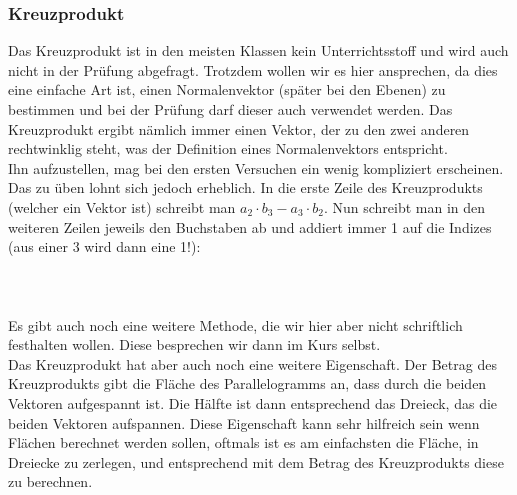 	\subsubsection{Kreuzprodukt}
		Das Kreuzprodukt ist in den meisten Klassen kein Unterrichtsstoff und wird
		auch nicht in der Prüfung abgefragt. Trotzdem wollen wir es hier ansprechen,
		da dies eine einfache Art ist, einen Normalenvektor (später bei den Ebenen) zu
		bestimmen und bei der Prüfung darf dieser auch verwendet werden. Das
		Kreuzprodukt ergibt nämlich immer einen Vektor, der zu den zwei anderen
		rechtwinklig steht, was der Definition eines Normalenvektors entspricht.\\
		Ihn aufzustellen, mag bei den ersten Versuchen ein wenig kompliziert
		erscheinen. Das zu üben lohnt sich jedoch erheblich. In die erste Zeile des
		Kreuzprodukts (welcher ein Vektor ist) schreibt man \(a_2\cdot b_3-a_3\cdot
		b_2\). Nun schreibt man in den weiteren Zeilen jeweils den Buchstaben ab und
		addiert immer 1 auf die Indizes (aus einer 3 wird dann eine 1!):
		\\ \\
		\formel{
			\[\vec{a} \times \vec{b}=
			\begin{pmatrix}
			 a_2b_3-a_3b_2\\
			 a_3b_1-a_1b_3\\
			 a_1b_2-a_2b_1
			\end{pmatrix}\]
		}
		\\ \\
		Es gibt auch noch eine weitere Methode, die wir hier aber nicht schriftlich
		festhalten wollen. Diese besprechen wir dann im Kurs selbst.\\
		Das Kreuzprodukt hat aber auch noch eine weitere Eigenschaft. Der Betrag des
		Kreuzprodukts gibt die Fläche des Parallelogramms an, dass durch die beiden
		Vektoren aufgespannt ist. Die Hälfte ist dann entsprechend das Dreieck, das
		die beiden Vektoren aufspannen. Diese Eigenschaft kann sehr hilfreich sein wenn
		Flächen berechnet werden sollen, oftmals ist es am einfachsten die Fläche, in
		Dreiecke zu zerlegen, und entsprechend mit dem Betrag des Kreuzprodukts diese
		zu berechnen.
		

